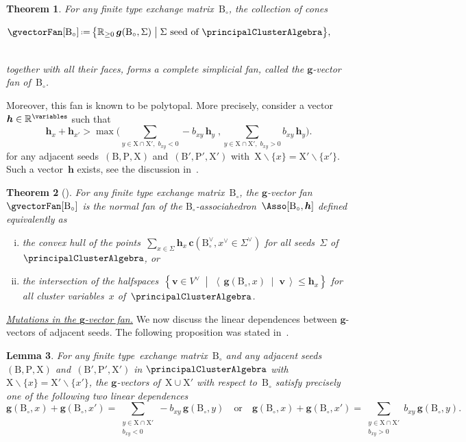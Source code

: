 \documentclass{amsart}
\newtheorem{theorem}{Theorem}[section]
\newtheorem{lemma}[theorem]{Lemma}
\theoremstyle{definition}
\newcommand{\R}{\mathbb{R}} %
\renewcommand{\b}[1]{{\boldsymbol{#1}}} %
\newcommand{\set}[2]{\left\{ #1 \;\middle|\; #2 \right\}} %
\newcommand{\bigset}[2]{\big\{ #1 \;\big|\; #2 \big\}} %
\newcommand{\ssm}{\smallsetminus} %
\newcommand{\dotprod}[2]{\left\langle \, #1 \; \middle| \; #2 \, \right\rangle} %
\newcommand{\eqdef}{\mbox{\,\raisebox{0.2ex}{\scriptsize\ensuremath{\mathrm:}}\ensuremath{=}\,}} %
\newcommand{\darkblue}{\color{darkblue}} %
\newcommand{\defn}[1]{\textsl{\darkblue #1}} %
\newcommand{\para}[1]{\medskip\noindent\uline{\textit{#1.}}} %
\newcommand{\gvectorFull}[2]{\b{g}(#1,#2)} %
\newcommand{\gvectorsFull}[2]{\b{g}(#1,#2)} %
\newcommand{\cvectorFull}[3]{\mathbf{c}(#1,#3 \in #2)} %
\newcommand{\seed}{\Sigma} %
\newcommand{\cluster}{\mathrm{X}} %
\newcommand{\coefficients}{\mathrm{P}} %
\newcommand{\B}{\mathrm{B}} %
\begin{document}
\begin{theorem}
\label{thm:gvectorFanCA}
For any finite type exchange matrix~$\B_\circ$, the collection of cones \\[.1cm]
\centerline{
$\gvectorFan[\B_\circ] \eqdef \bigset{\R_{\ge0} \, \gvectorsFull{\B_\circ}{\seed}}{\seed \text{ seed of } \principalClusterAlgebra},$
} \\[.1cm]
together with all their faces, forms a complete simplicial fan, called the \defn{$\b{g}$-vector fan} of~$\B_\circ$.
\end{theorem}

Moreover, this fan is known to be polytopal.
More precisely, consider a vector~$\b{h} \in \R^{\variables}$ such that
\[
\b{h}_x + \b{h}_{x'} > \max \Big( \sum_{{y \in \cluster \cap \cluster', \; b_{xy} < 0}} -b_{xy} \, \b{h}_y \;,  \sum_{{y \in \cluster \cap \cluster', \; b_{xy} > 0}} b_{xy} \, \b{h}_y \Big).
\]
for any adjacent seeds~$(\B, \coefficients, \cluster)$ and~$(\B', \coefficients', \cluster')$ with~$\cluster \ssm \{x\} = \cluster' \ssm \{x'\}$.
Such a vector~$\b{h}$ exists, see the discussion in~\cite[Prop.~28]{HohlwegPilaudStella}.

\begin{theorem}[{\cite[Thm.~26]{HohlwegPilaudStella}}]
\label{thm:generalizedAsso}
For any finite type exchange matrix~$\B_\circ$, the $\b{g}$-vector fan~$\gvectorFan[\B_\circ]$ is the normal fan of the \defn{$\B_\circ$-associahedron}~$\Asso[\B_\circ, \b{h}]$ defined equivalently as
\begin{enumerate}[(i)]
\item the convex hull of the points~$\sum_{x \in \seed} \b{h}_x \, \cvectorFull{\B_\circ^\vee}{\seed^\vee}{x^\vee}$ for all seeds~$\seed$ of~$\principalClusterAlgebra$, or
\item the intersection of the halfspaces~$\set{\b{v} \in V^\vee}{\dotprod{\gvectorFull{\B_\circ}{x}}{\b{v}} \le \b{h}_x}$ for all cluster variables~$x$ of~$\principalClusterAlgebra$.
\end{enumerate}
\end{theorem}

\para{Mutations in the $\b{g}$-vector fan}
%
We now discuss the linear dependences between $\b{g}$-vectors of adjacent seeds.
The following proposition was stated in~\cite[Lem.~19]{HohlwegPilaudStella}.

\begin{lemma}
\label{lem:linearDependencegvectorsCA}
For any finite type~exchange matrix~$\B_\circ$ and any adjacent seeds~${(\B, \coefficients, \cluster)}$ and~${(\B', \coefficients', \cluster')}$ in $\principalClusterAlgebra$ with~$\cluster \ssm \{x\} = \cluster' \ssm \{x'\}$, the $\b{g}$-vectors of~$\cluster \cup \cluster'$ with respect to~$\B_\circ$ satisfy precisely one of the following two linear dependences
\[
\gvectorFull{\B_\circ}{x} + \gvectorFull{\B_\circ}{x'} = \sum_{\substack{y \in \cluster \cap \cluster' \\ b_{xy} < 0}} -b_{xy} \, \gvectorFull{\B_\circ}{y}
\quad\text{or}\quad
\gvectorFull{\B_\circ}{x} + \gvectorFull{\B_\circ}{x'} = \sum_{\substack{y \in \cluster \cap \cluster' \\ b_{xy} > 0}} b_{xy} \, \gvectorFull{\B_\circ}{y}.
\]
\end{lemma}
\end{document}
